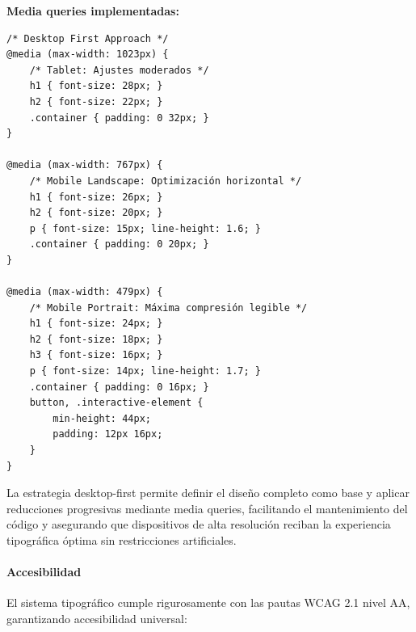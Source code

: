 \documentclass[12pt,a4paper,oneside]{article}
\begin{document}
\textbf{Media queries implementadas:}

\begin{verbatim}
/* Desktop First Approach */
@media (max-width: 1023px) { 
    /* Tablet: Ajustes moderados */
    h1 { font-size: 28px; }
    h2 { font-size: 22px; }
    .container { padding: 0 32px; }
}

@media (max-width: 767px) { 
    /* Mobile Landscape: Optimización horizontal */
    h1 { font-size: 26px; }
    h2 { font-size: 20px; }
    p { font-size: 15px; line-height: 1.6; }
    .container { padding: 0 20px; }
}

@media (max-width: 479px) { 
    /* Mobile Portrait: Máxima compresión legible */
    h1 { font-size: 24px; }
    h2 { font-size: 18px; }
    h3 { font-size: 16px; }
    p { font-size: 14px; line-height: 1.7; }
    .container { padding: 0 16px; }
    button, .interactive-element { 
        min-height: 44px; 
        padding: 12px 16px; 
    }
}
\end{verbatim}

La estrategia desktop-first permite definir el diseño completo como base y aplicar reducciones progresivas mediante media queries, facilitando el mantenimiento del código y asegurando que dispositivos de alta resolución reciban la experiencia tipográfica óptima sin restricciones artificiales.

\paragraph{Accesibilidad}
El sistema tipográfico cumple rigurosamente con las pautas WCAG 2.1 nivel AA, garantizando accesibilidad universal:
\end{document}
